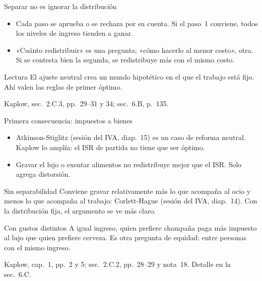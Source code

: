 \documentclass[aspectratio=169,11pt]{beamer}
\newcommand{\fuente}[1]{\par\vfill{\small\color{cGris}#1\par}}
\begin{document}
\begin{frame}{Separar no es ignorar la distribución}
  \centering
  \par\medskip
  \raggedright
  \pause
  \begin{itemize}
    \item Cada paso se aprueba o se rechaza por su cuenta. Si el paso~1 conviene, todos los niveles de ingreso tienden a ganar.
    \item «Cuánto redistribuir» es una pregunta; «cómo hacerlo al menor costo», otra. Si se contesta bien la segunda, se redistribuye más con el mismo costo.
  \end{itemize}
  \pause
  \begin{block}{Lectura}
    El ajuste neutral crea un mundo hipotético en el que el trabajo está fijo. Ahí valen las reglas de primer óptimo.
  \end{block}
  \fuente{Kaplow, sec.~2.C.3, pp.~29--31 y 34; sec.~6.B, p.~135.}
\end{frame}

\begin{frame}{Primera consecuencia: impuestos a bienes}
  \begin{itemize}
    \item Atkinson-Stiglitz (sesión del IVA, diap.~15) es un caso de reforma neutral. Kaplow lo amplía: el ISR de partida no tiene que ser óptimo.
    \item Gravar el lujo o exentar alimentos no redistribuye mejor que el ISR. Solo agrega distorsión.
  \end{itemize}
  \pause
  \begin{block}{Sin separabilidad}
    Conviene gravar relativamente más lo que acompaña al ocio y menos lo que acompaña al trabajo: Corlett-Hague (sesión del IVA, diap.~14). Con la distribución fija, el argumento se ve más claro.
  \end{block}
  \pause
  \begin{block}{Con gustos distintos}
    A igual ingreso, quien prefiere champaña paga más impuesto al lujo que quien prefiere cerveza. Es otra pregunta de equidad: entre personas con el mismo ingreso.
  \end{block}
  \fuente{Kaplow, cap.~1, pp.~2 y 5; sec.~2.C.2, pp.~28--29 y nota~18. Detalle en la sec.~6.C.}
\end{frame}
\end{document}
